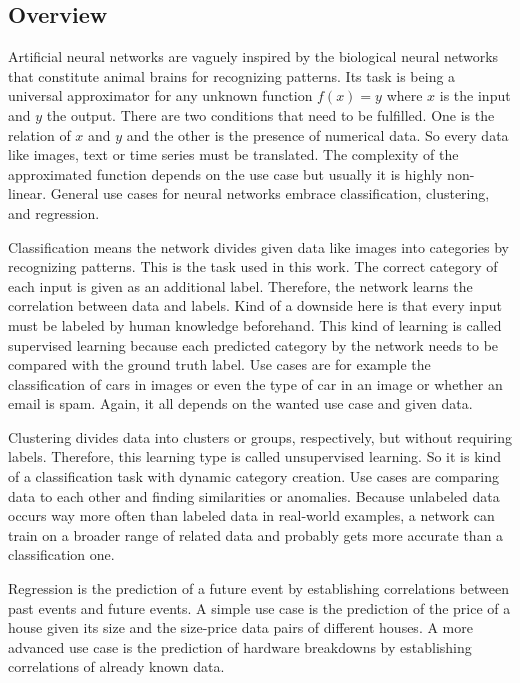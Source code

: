 \subsection{Overview}
\label{sec:neural-networks-overview}
Artificial neural networks are vaguely inspired by the biological neural networks that constitute animal brains for recognizing patterns.
Its task is being a universal approximator for any unknown function $f(x) = y$ where $x$ is the input and $y$ the output.
There are two conditions that need to be fulfilled.
One is the relation of $x$ and $y$ and the other is the presence of numerical data.
So every data like images, text or time series must be translated.
The complexity of the approximated function depends on the use case but usually it is highly non-linear.
General use cases for neural networks embrace classification, clustering, and regression.

Classification means the network divides given data like images into categories by recognizing patterns.
This is the task used in this work.
The correct category of each input is given as an additional label.
Therefore, the network learns the correlation between data and labels.
Kind of a downside here is that every input must be labeled by human knowledge beforehand.
This kind of learning is called supervised learning because each predicted category by the network needs to be compared with the ground truth label.
Use cases are for example the classification of cars in images or even the type of car in an image or whether an email is spam.
Again, it all depends on the wanted use case and given data.

Clustering divides data into clusters or groups, respectively, but without requiring labels.
Therefore, this learning type is called unsupervised learning.
So it is kind of a classification task with dynamic category creation.
Use cases are comparing data to each other and finding similarities or anomalies.
Because unlabeled data occurs way more often than labeled data in real-world examples, a network can train on a broader range of related data and probably gets more accurate than a classification one.

Regression is the prediction of a future event by establishing correlations between past events and future events.
A simple use case is the prediction of the price of a house given its size and the size-price data pairs of different houses.
A more advanced use case is the prediction of hardware breakdowns by establishing correlations of already known data.